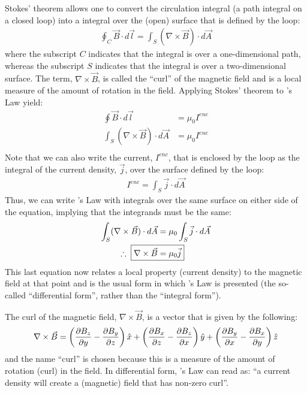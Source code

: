 Stokes' theorem allows one to convert the circulation integral (a path integral on a closed loop) into a integral over the (open) surface that is defined by the loop:
\begin{align*}
\oint_C \vec B \cdot d\vec l = \int_S (\nabla \times \vec B) \cdot d\vec A
\end{align*}
where the subscript $C$ indicates that the integral is over a one-dimensional path, whereas the subscript $S$ indicates that the integral is over a two-dimensional surface. The term, $\nabla \times \vec B$, is called the ``curl'' of the magnetic field and is a local measure of the amount of rotation in the field. Applying Stokes' theorem to \ampere's Law yield:
\begin{align*}
\oint \vec B \cdot d\vec l &= \mu_0 I^{enc}\\
\int_S (\nabla \times \vec B) \cdot d\vec A &= \mu_0 I^{enc}\\
\end{align*}
Note that we can also write the current, $I^{enc}$, that is enclosed by the loop as the integral of the current density, $\vec j$, over the surface defined by the loop:
\begin{align*}
I^{enc}=\int _S \vec j \cdot d\vec A
\end{align*}
Thus, we can write \ampere's Law with integrals over the same surface on either side of the equation, implying that the integrands must be the same:
\begin{align*}
\int_S (\nabla \times \vec B) \cdot d\vec A &= \mu_0 \int _S \vec j \cdot d\vec A\\
\therefore\;\;\Aboxed{ \nabla \times \vec B &= \mu_0 \vec j}
\end{align*}
This last equation now relates a local property (current density) to the magnetic field at that point and is the usual form in which \ampere's Law is presented (the so-called ``differential form'', rather than the ``integral form''). 

The curl of the magnetic field, $\nabla \times \vec B$, is a vector that is given by the following:
\begin{align*}
\nabla \times \vec B = \left(\frac{\partial B_z}{\partial y}-\frac{\partial B_y}{\partial z}\right)\hat x + \left(\frac{\partial B_x}{\partial z}-\frac{\partial B_z}{\partial x}\right)\hat y+\left(\frac{\partial B_y}{\partial x}-\frac{\partial B_x}{\partial y}\right)\hat z
\end{align*}
and the name ``curl'' is chosen because this is a measure of the amount of rotation (curl) in the field. In differential form, \ampere's Law can read as: ``a current density will create a (magnetic) field that has non-zero curl''.

